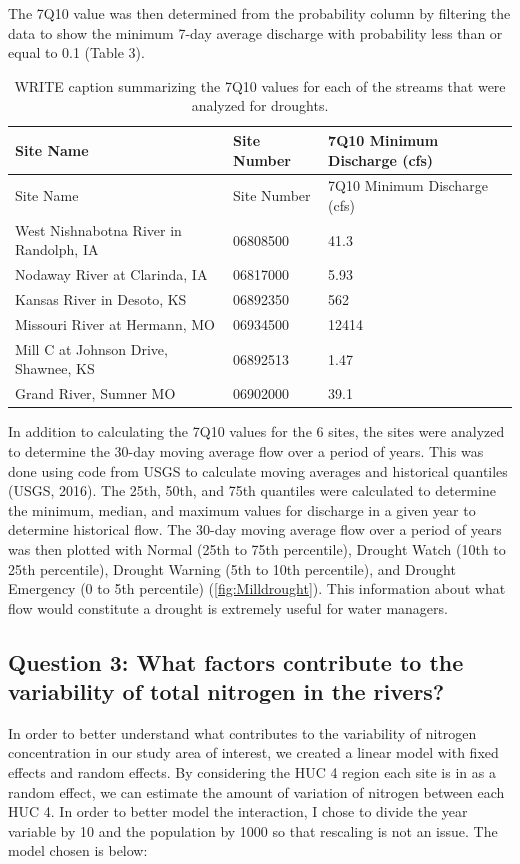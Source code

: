 \documentclass[12pt,]{article}
\begin{document}
The 7Q10 value was then determined from the probability column by
filtering the data to show the minimum 7-day average discharge with
probability less than or equal to 0.1 (Table 3).

\begin{longtable}[]{@{}lll@{}}
\caption{WRITE caption summarizing the 7Q10 values for each of the
streams that were analyzed for droughts.}\tabularnewline
\toprule
Site Name & Site Number & 7Q10 Minimum Discharge (cfs)\tabularnewline
\midrule
\endfirsthead
\toprule
Site Name & Site Number & 7Q10 Minimum Discharge (cfs)\tabularnewline
\midrule
\endhead
West Nishnabotna River in Randolph, IA & 06808500 & 41.3\tabularnewline
Nodaway River at Clarinda, IA & 06817000 & 5.93\tabularnewline
Kansas River in Desoto, KS & 06892350 & 562\tabularnewline
Missouri River at Hermann, MO & 06934500 & 12414\tabularnewline
Mill C at Johnson Drive, Shawnee, KS & 06892513 & 1.47\tabularnewline
Grand River, Sumner MO & 06902000 & 39.1\tabularnewline
\bottomrule
\end{longtable}

In addition to calculating the 7Q10 values for the 6 sites, the sites
were analyzed to determine the 30-day moving average flow over a period
of years. This was done using code from USGS to calculate moving
averages and historical quantiles (USGS, 2016). The 25th, 50th, and 75th
quantiles were calculated to determine the minimum, median, and maximum
values for discharge in a given year to determine historical flow. The
30-day moving average flow over a period of years was then plotted with
Normal (25th to 75th percentile), Drought Watch (10th to 25th
percentile), Drought Warning (5th to 10th percentile), and Drought
Emergency (0 to 5th percentile) (\autoref{fig:Milldrought}). This
information about what flow would constitute a drought is extremely
useful for water managers.

\hypertarget{question-3-what-factors-contribute-to-the-variability-of-total-nitrogen-in-the-rivers}{%
\subsection{Question 3: What factors contribute to the variability of
total nitrogen in the
rivers?}\label{question-3-what-factors-contribute-to-the-variability-of-total-nitrogen-in-the-rivers}}

In order to better understand what contributes to the variability of
nitrogen concentration in our study area of interest, we created a
linear model with fixed effects and random effects. By considering the
HUC 4 region each site is in as a random effect, we can estimate the
amount of variation of nitrogen between each HUC 4. In order to better
model the interaction, I chose to divide the year variable by 10 and the
population by 1000 so that rescaling is not an issue. The model chosen
is below:
\end{document}

